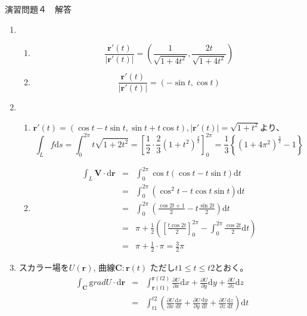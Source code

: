 \documentclass{jarticle}
\def\d{\mathrm d}
\def\grad{\mathrm grad}
\begin{document}
\newpage

\begin{center} {\Large 演習問題４　解答} \end{center}
  \begin{enumerate}
    \item
      \begin{enumerate}
        \item
          \[\frac {\bm r'(t)}{|\bm r'(t)|} = (\frac{1}{\sqrt{1+4t^2}}, \frac{2t}{\sqrt{1+4t^2}})\]
        \item
          \[\frac {\bm r'(t)}{|\bm r'(t)|} = (-\sin t, \cos t) \]
      \end{enumerate}
    \item
      \begin{enumerate}
        \item
          $\bm r'(t) = (\cos t - t \sin t, \sin t + t \cos t),|\bm r'(t)| = \sqrt{1+t^2}$より、
          \[ \int_L f \d s = \int_0^{2\pi} t \sqrt{1+2t^2} = \left[ \frac{1}{2} \cdot \frac{2}{3}  (1+t^2)^\frac{3}{2} \right]_0^{2\pi} = \frac{1}{3} \left\{ (1+4\pi^2)^\frac{3}{2} - 1 \right\} \]
        \item
          \begin{eqnarray*} 
            \int_L \bm V \cdot \d \bm{r} & = & \int_0^{2\pi} \cos t ( \cos t - t \sin t ) \d t \\
            & = & \int_0^{2\pi} ( \cos^2 t - t \cos t \sin t ) \d t  \\
            & = & \int_0^{2\pi} \left( \frac{\cos 2t + 1}{2} - t \frac{\sin 2t}{2} \right) \d t \\
            & = & \pi + \frac{1}{2} \left( \left[ \frac{t \cos 2t}{2} \right]_0^{2\pi} - \int_0^{2\pi} \frac{\cos 2t}{2} \d t \right)\\
            & = &  \pi + \frac{1}{2} \cdot \pi = \frac{3}{2} \pi 
          \end{eqnarray*}
      \end{enumerate}
    \item
      スカラー場を$U(\bm r)$, 曲線$\bm C: \bm r(t)$ ただし$t1 \leq t \leq t2$とおく。
      \begin{eqnarray*}
        \int_{\bm C} \grad U \cdot \d \bm{r} & = & \int_{\bm r(t1)}^{\bm r(t2)} \frac{\partial U}{\partial x} \d x + \frac{\partial U}{\partial y} \d y + \frac{\partial U}{\partial z} \d z \\
        & = & \int_{t1}^{t2} \left( \frac{\partial U}{\partial x} \frac{\d x}{\d t} + \frac{\partial U}{\partial y} \frac{\d y}{\d t} + \frac{\partial U}{\partial z} \frac{\d z}{\d t} \right) \d t \\

\end{eqnarray*}
\end{enumerate}
\end{document}
